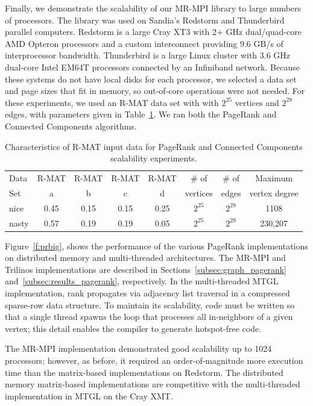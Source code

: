 Finally, we demonstrate the scalability of our MR-MPI library to large
numbers of processors.  The library was used on Sandia's Redstorm and
Thunderbird parallel computers.  Redstorm is a large Cray XT3 with 2+
{GHz} dual/quad-core AMD Opteron processors and a custom interconnect
providing 9.6 GB/s of interprocessor bandwidth.  Thunderbird is a
large Linux cluster with 3.6 {GHz} dual-core Intel EM64T processors
connected by an Infiniband network.  Because these systems do not have
local disks for each processor, we selected a data set and page sizes
that fit in memory, so out-of-core operations were not needed.  For
these experiments, we used an R-MAT data set with with $2^{25}$
vertices and $2^{28}$ edges, with parameters given in
Table~\ref{t:rmat}.  We ran both the PageRank and Connected Components
algorithms.

\begin{table}
\begin{center}
\begin{tabular}{|l|c|c|c|c|c|c|c|}
\hline
Data & R-MAT  & R-MAT  & R-MAT  & R-MAT  & \# of    & \# of & Maximum \\
Set  & a      & b      & c      & d      & vertices & edges & vertex degree\\
\hline
nice  & 0.45 & 0.15 & 0.15 & 0.25 & $2^{25}$ & $2^{28}$ & 1108 \\
nasty & 0.57 & 0.19 & 0.19 & 0.05 & $2^{25}$ & $2^{28}$ & 230,207\\
\hline
\end{tabular}
\caption{Characteristics of R-MAT input data for PageRank and Connected
Components scalability experiments.}
\label{t:rmat}
\end{center}
\end{table}

Figure~\ref{f:prbig}, shows the performance of the various PageRank
implementations on distributed memory and multi-threaded
architectures.  The MR-MPI and Trilinos implementations are described
in Sections~\ref{subsec:graph_pagerank}
and~\ref{subsec:results_pagerank}, respectively.  In the
multi-threaded MTGL implementation, rank propagates via adjacency list
traversal in a compressed sparse-row data structure.  To maintain its
scalability, code must be written so that a single thread spawns the
loop that processes all in-neighbors of a given vertex; this detail
enables the compiler to generate hotspot-free code.

The MR-MPI implementation demonstrated good scalability up to 1024
processors; however, as before, it required an order-of-magnitude more
execution time than the matrix-based implementations on Redstorm.  The
distributed memory matrix-based implementations are competitive with
the multi-threaded implementation in MTGL on the Cray XMT.

